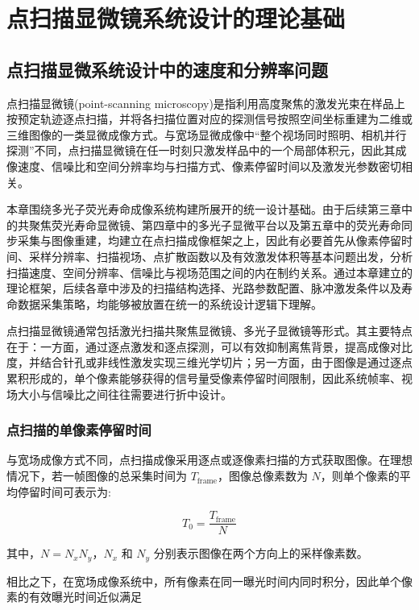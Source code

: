\chapter{点扫描显微镜系统设计的理论基础}\label{chap:2}
\section{点扫描显微系统设计中的速度和分辨率问题}\label{2.1}
点扫描显微镜(point-scanning microscopy)是指利用高度聚焦的激发光束在样品上按预定轨迹逐点扫描，并将各扫描位置对应的探测信号按照空间坐标重建为二维或三维图像的一类显微成像方式。与宽场显微成像中``整个视场同时照明、相机并行探测''不同，点扫描显微镜在任一时刻只激发样品中的一个局部体积元，因此其成像速度、信噪比和空间分辨率均与扫描方式、像素停留时间以及激发光参数密切相关。

本章围绕多光子荧光寿命成像系统构建所展开的统一设计基础。由于后续第三章中的共聚焦荧光寿命显微镜、第四章中的多光子显微平台以及第五章中的荧光寿命同步采集与图像重建，均建立在点扫描成像框架之上，因此有必要首先从像素停留时间、采样分辨率、扫描视场、点扩散函数以及有效激发体积等基本问题出发，分析扫描速度、空间分辨率、信噪比与视场范围之间的内在制约关系。通过本章建立的理论框架，后续各章中涉及的扫描结构选择、光路参数配置、脉冲激发条件以及寿命数据采集策略，均能够被放置在统一的系统设计逻辑下理解。

点扫描显微镜通常包括激光扫描共聚焦显微镜、多光子显微镜等形式。其主要特点在于：一方面，通过逐点激发和逐点探测，可以有效抑制离焦背景，提高成像对比度，并结合针孔或非线性激发实现三维光学切片；另一方面，由于图像是通过逐点累积形成的，单个像素能够获得的信号量受像素停留时间限制，因此系统帧率、视场大小与信噪比之间往往需要进行折中设计。

\subsection{点扫描的单像素停留时间}\label{2.1.1}
与宽场成像方式不同，点扫描成像采用逐点或逐像素扫描的方式获取图像。在理想情况下，若一帧图像的总采集时间为 $T_{\mathrm{frame}}$，图像总像素数为 $N$，则单个像素的平均停留时间可表示为:

\begin{equation}
T_0=\frac{T_{\mathrm{frame}}}{N}
\label{eq:dwell_time_basic}
\end{equation}

其中，$N=N_xN_y$，$N_x$ 和 $N_y$ 分别表示图像在两个方向上的采样像素数。

相比之下，在宽场成像系统中，所有像素在同一曝光时间内同时积分，因此单个像素的有效曝光时间近似满足

